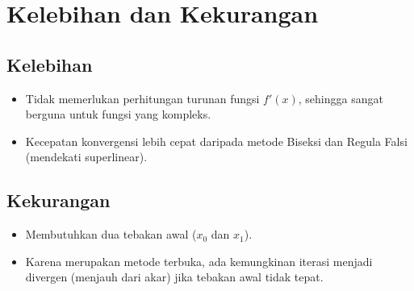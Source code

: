 \documentclass[12pt,a4paper]{article}
\begin{document}
\section{Kelebihan dan Kekurangan}
\subsection{Kelebihan}
\begin{itemize}
  \item Tidak memerlukan perhitungan turunan fungsi $f'(x)$, sehingga sangat berguna untuk fungsi yang kompleks.
  \item Kecepatan konvergensi lebih cepat daripada metode Biseksi dan Regula Falsi (mendekati superlinear).
\end{itemize}

\subsection{Kekurangan}
\begin{itemize}
  \item Membutuhkan dua tebakan awal ($x_0$ dan $x_1$).
  \item Karena merupakan metode terbuka, ada kemungkinan iterasi menjadi divergen (menjauh dari akar) jika tebakan awal tidak tepat.
\end{itemize}
\end{document}
